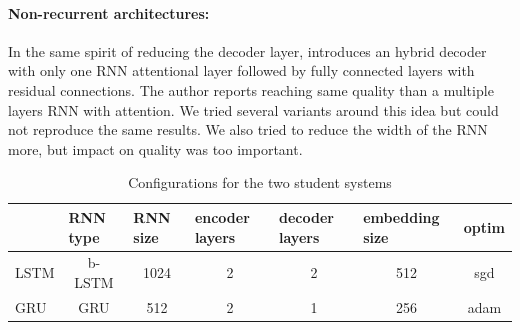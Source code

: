 \documentclass[11pt,a4paper]{article}
\begin{document}
\paragraph{Non-recurrent architectures:}
In the same spirit of reducing the decoder layer,  introduces an hybrid decoder with only one RNN attentional layer followed by fully connected layers with residual connections. The author reports reaching same quality than a multiple layers RNN with attention. We tried several variants around this idea but could not reproduce the same results.
We also tried to reduce the width of the RNN more, but impact on quality was too important.
\begin{table}[]
\centering
\begin{tabular}{lcccccc}
\toprule
     & \multicolumn{1}{l}{RNN type} & \multicolumn{1}{l}{RNN size} & \multicolumn{1}{l}{encoder layers} & \multicolumn{1}{l}{decoder layers} & \multicolumn{1}{l}{embedding size} & \multicolumn{1}{l}{optim} \\ \midrule
LSTM & b-LSTM                         & 1024                         & 2                                  & 2                                  & 512                                & sgd                       \\
GRU & GRU                          & 512                          & 2                                  & 1                                  & 256                                & adam                      \\
\bottomrule
\end{tabular}
\caption{Configurations for the two student systems}
\label{table:config}
\end{table}
\end{document}
